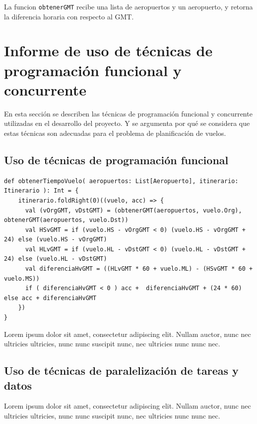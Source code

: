 \documentclass[letterpaper]{article}
\begin{document}
La funcion \texttt{obtenerGMT} recibe una lista de aeropuertos y un aeropuerto, y retorna la diferencia horaria con respecto al GMT.

\section{Informe de uso de técnicas de programación funcional y concurrente}

En esta sección se describen las técnicas de programación funcional y concurrente utilizadas en el desarrollo del proyecto.
Y se argumenta por qué se considera que estas técnicas son adecuadas para el problema de planificación de vuelos. 

\subsection{Uso de técnicas de programación funcional}




\begin{lstlisting}[caption={Función para obtener el tiempo de vuelo}, label={lst:obtenerTiempoVuelo}, captionpos=b]
def obtenerTiempoVuelo( aeropuertos: List[Aeropuerto], itinerario: Itinerario ): Int = {    
    itinerario.foldRight(0)((vuelo, acc) => {
      val (vOrgGMT, vDstGMT) = (obtenerGMT(aeropuertos, vuelo.Org), obtenerGMT(aeropuertos, vuelo.Dst))
      val HSvGMT = if (vuelo.HS - vOrgGMT < 0) (vuelo.HS - vOrgGMT + 24) else (vuelo.HS - vOrgGMT)
      val HLvGMT = if (vuelo.HL - vDstGMT < 0) (vuelo.HL - vDstGMT + 24) else (vuelo.HL - vDstGMT)
      val diferenciaHvGMT = ((HLvGMT * 60 + vuelo.ML) - (HSvGMT * 60 + vuelo.MS))
      if ( diferenciaHvGMT < 0 ) acc +  diferenciaHvGMT + (24 * 60) else acc + diferenciaHvGMT
    })
}
\end{lstlisting}

Lorem ipsum dolor sit amet, consectetur adipiscing elit.
Nullam auctor, nunc nec ultricies ultricies, nunc nunc
suscipit nunc, nec ultricies nunc nunc nec.

\subsection{Uso de técnicas de paralelización de tareas y datos}

Lorem ipsum dolor sit amet, consectetur adipiscing elit.
Nullam auctor, nunc nec ultricies ultricies, nunc nunc
suscipit nunc, nec ultricies nunc nunc nec.
\end{document}
